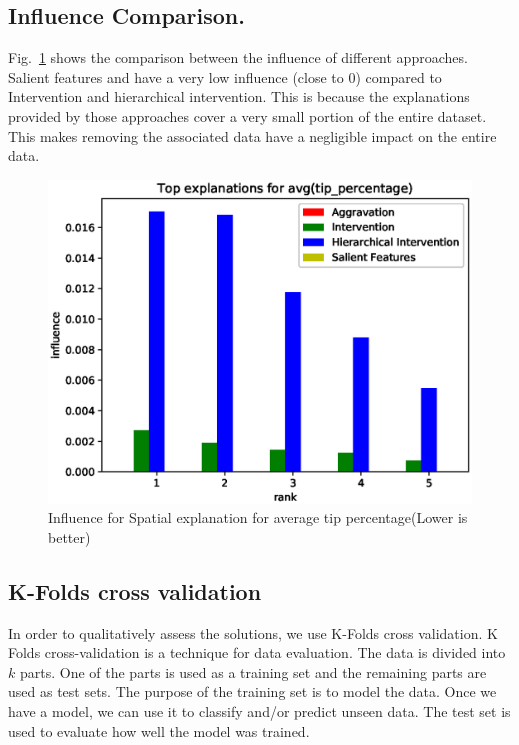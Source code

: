 \subsection{Influence Comparison.}
Fig.~\ref{fig:influence_comparison} shows the comparison between the influence of different approaches. Salient features and {\aggravation} have a very low influence (close to 0) compared to Intervention and hierarchical intervention. This is because the explanations provided by those approaches cover a very small portion of the entire dataset. This makes removing the associated data have a negligible impact on the entire data.
\begin{figure}[h]
	\includegraphics[width=0.96\columnwidth]{images/Top_explanations_for_avg_tip_percentage_influence}
	\caption{Influence for Spatial explanation for average tip percentage(Lower is better)}
	\label{fig:influence_comparison}
\end{figure}

\subsection{K-Folds cross validation}
In order to qualitatively assess the solutions, we use K-Folds cross validation\cite{refaeilzadeh2009cross}. 
K Folds cross-validation is a technique for data evaluation\cite{kohavi1995study,refaeilzadeh2009cross}. The data is divided into $k$ parts. One of the parts is used as a training set and the remaining parts are used as test sets. The purpose of the training set is to model the data. Once we have a model, we can use it to classify and/or predict unseen data. The test set is used to evaluate how well the model was trained.

